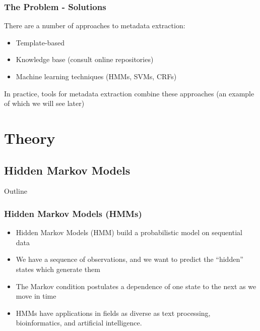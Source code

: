 \documentclass{beamer}
\begin{document}

\begin{frame}
\frametitle{The Problem - Solutions}
There are a number of approaches to metadata extraction:
\begin{itemize}
\item Template-based
\item Knowledge base (consult online repositories)
\item Machine learning techniques (HMMs, SVMs, CRFs)
\end{itemize}
In practice, tools for metadata extraction combine these approaches (an example of which we will see later) %
\end{frame}


\section{Theory}
\subsection{Hidden Markov Models}


\begin{frame}[noframenumbering]{Outline}
\tableofcontents[currentsubsection]
\end{frame}


\begin{frame}
\frametitle{Hidden Markov Models (HMMs)}
\begin{itemize}
\item Hidden Markov Models (HMM) build a probabilistic model on sequential data
\item We have a sequence of observations, and we want to predict the ``hidden'' states which generate them
\item The Markov condition postulates a dependence of one state to the next as we move in time
\item HMMs have applications in fields as diverse as text processing, bioinformatics, and artificial intelligence.
\end{itemize}
\end{frame}

\end{document}
